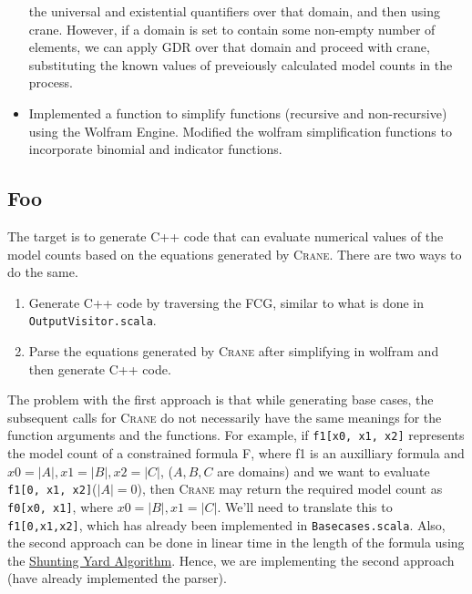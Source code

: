 \documentclass{article}
\begin{document}
\begin{itemize}
        the universal and existential quantifiers over that domain, and then
        using crane. However, if a domain is set to contain some non-empty
        number of elements, we can apply GDR over that domain and proceed with
        crane, substituting the known values of preveiously calculated model
        counts in the process.
  \item Implemented a function to simplify functions (recursive and
        non-recursive) using the Wolfram Engine. Modified the wolfram
        simplification functions to incorporate binomial and indicator
        functions.
\end{itemize}

\subsection{Foo}

The target is to generate C++ code that can evaluate numerical values of the
model counts based on the equations generated by \textsc{Crane}. There are two
ways to do the same.
\begin{enumerate}
  \item Generate C++ code by traversing the FCG, similar to what is done in
        \texttt{OutputVisitor.scala}.
  \item Parse the equations generated by \textsc{Crane} after simplifying in
        wolfram and then generate C++ code.
\end{enumerate}

The problem with the first approach is that while generating base cases, the
subsequent calls for \textsc{Crane} do not necessarily have the same meanings
for the function arguments and the functions. For example, if \texttt{f1[x0, x1,
  x2]} represents the model count of a constrained formula F, where f1 is an
auxilliary formula and $x0 = |A|, x1 = |B|, x2 = |C|$, ($A,B,C$ are domains) and
we want to evaluate \texttt{f1[0, x1, x2]}($|A| = 0$), then \textsc{Crane} may
return the required model count as \texttt{f0[x0, x1]}, where
$x0 = |B|, x1 = |C|$. We'll need to translate this to \texttt{f1[0,x1,x2]},
which has already been implemented in \texttt{Basecases.scala}. Also, the second
approach can be done in linear time in the length of the formula using
the
\href{https://en.wikipedia.org/wiki/Shunting_yard_algorithm#:~:text=In%20computer%20science%2C%20the%20shunting,abstract%20syntax%20tree%20(AST).}{Shunting
  Yard Algorithm}. Hence, we are implementing the second approach (have already
implemented the parser).
\end{document}
